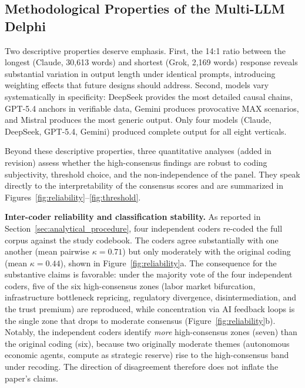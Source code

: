 \documentclass[preprint,review,12pt]{elsarticle}
\begin{document}
\subsection{Methodological Properties of the Multi-LLM Delphi}
\label{sec:methodological_properties}

Two descriptive properties deserve emphasis. First, the 14:1 ratio between the longest (Claude, 30,613 words) and shortest (Grok, 2,169 words) response reveals substantial variation in output length under identical prompts, introducing weighting effects that future designs should address. Second, models vary systematically in specificity: DeepSeek provides the most detailed causal chains, GPT-5.4 anchors in verifiable data, Gemini produces provocative MAX scenarios, and Mistral produces the most generic output. Only four models (Claude, DeepSeek, GPT-5.4, Gemini) produced complete output for all eight verticals.

Beyond these descriptive properties, three quantitative analyses (added in revision) assess whether the high-consensus findings are robust to coding subjectivity, threshold choice, and the non-independence of the panel. They speak directly to the interpretability of the consensus scores and are summarized in Figures~\ref{fig:reliability}--\ref{fig:threshold}.

\textbf{Inter-coder reliability and classification stability.} As reported in Section~\ref{sec:analytical_procedure}, four independent coders re-coded the full corpus against the study codebook. The coders agree substantially with one another (mean pairwise $\kappa=0.71$) but only moderately with the original coding (mean $\kappa=0.44$), shown in Figure~\ref{fig:reliability}a. The consequence for the substantive claims is favorable: under the majority vote of the four independent coders, five of the six high-consensus zones (labor market bifurcation, infrastructure bottleneck repricing, regulatory divergence, disintermediation, and the trust premium) are reproduced, while concentration via AI feedback loops is the single zone that drops to moderate consensus (Figure~\ref{fig:reliability}b). Notably, the independent coders identify \emph{more} high-consensus zones (seven) than the original coding (six), because two originally moderate themes (autonomous economic agents, compute as strategic reserve) rise to the high-consensus band under recoding. The direction of disagreement therefore does not inflate the paper's claims.
\end{document}
